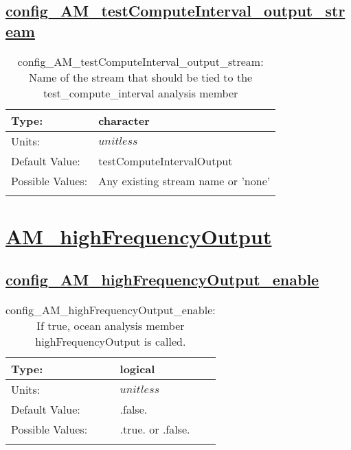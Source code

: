 \subsection[config\_AM\_testComputeInterval\_output\_stream]{\hyperref[sec:nm_tab_AM_testComputeInterval]{config\_AM\_testComputeInterval\_output\_stream}}
\label{subsec:nm_sec_config_AM_testComputeInterval_output_stream}
\begin{center}
\begin{longtable}{| p{2.0in} || p{4.0in} |}
    \hline
    Type: & character \\
    \hline
    Units: & $unitless$ \\
    \hline
    Default Value: & testComputeIntervalOutput \\
    \hline
    Possible Values: & Any existing stream name or 'none' \\
    \hline
    \caption{config\_AM\_testComputeInterval\_output\_stream: Name of the stream that should be tied to the test\_compute\_interval analysis member}
\end{longtable}
\end{center}
\section[AM\_highFrequencyOutput]{\hyperref[sec:nm_tab_AM_highFrequencyOutput]{AM\_highFrequencyOutput}}
\label{sec:nm_sec_AM_highFrequencyOutput}
\subsection[config\_AM\_highFrequencyOutput\_enable]{\hyperref[sec:nm_tab_AM_highFrequencyOutput]{config\_AM\_highFrequencyOutput\_enable}}
\label{subsec:nm_sec_config_AM_highFrequencyOutput_enable}
\begin{center}
\begin{longtable}{| p{2.0in} || p{4.0in} |}
    \hline
    Type: & logical \\
    \hline
    Units: & $unitless$ \\
    \hline
    Default Value: & .false. \\
    \hline
    Possible Values: & .true. or .false. \\
    \hline
    \caption{config\_AM\_highFrequencyOutput\_enable: If true, ocean analysis member highFrequencyOutput is called.}
\end{longtable}
\end{center}
